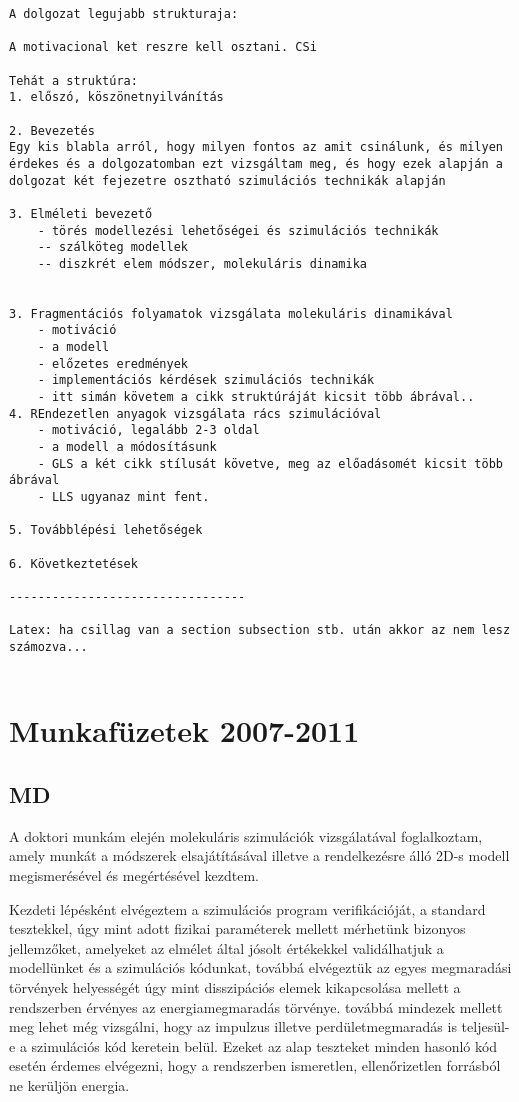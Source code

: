 \begin{verbatim}
A dolgozat legujabb strukturaja:

A motivacional ket reszre kell osztani. CSi

Tehát a struktúra: 
1. előszó, köszönetnyilvánítás

2. Bevezetés
Egy kis blabla arról, hogy milyen fontos az amit csinálunk, és milyen érdekes és a dolgozatomban ezt vizsgáltam meg, és hogy ezek alapján a dolgozat két fejezetre osztható szimulációs technikák alapján

3. Elméleti bevezető
	- törés modellezési lehetőségei és szimulációs technikák
	-- szálköteg modellek
	-- diszkrét elem módszer, molekuláris dinamika
	

3. Fragmentációs folyamatok vizsgálata molekuláris dinamikával
	- motiváció
	- a modell
	- előzetes eredmények
	- implementációs kérdések szimulációs technikák
	- itt simán követem a cikk struktúráját kicsit több ábrával..
4. REndezetlen anyagok vizsgálata rács szimulációval
	- motiváció, legalább 2-3 oldal
	- a modell a módosításunk
	- GLS a két cikk stílusát követve, meg az előadásomét kicsit több ábrával
	- LLS ugyanaz mint fent.

5. Továbblépési lehetőségek

6. Következtetések

---------------------------------

Latex: ha csillag van a section subsection stb. után akkor az nem lesz számozva...


\end{verbatim}

\chapter{Munkafüzetek 2007-2011}

\section{MD}

A doktori munkám elején molekuláris szimulációk vizsgálatával foglalkoztam, amely munkát a módszerek elsajátításával illetve a rendelkezésre álló 2D-s modell megismerésével és megértésével kezdtem.

Kezdeti lépésként elvégeztem a szimulációs program verifikációját, a standard tesztekkel, úgy mint adott  fizikai paraméterek mellett mérhetünk bizonyos jellemzőket, amelyeket az elmélet által jósolt értékekkel validálhatjuk a modellünket és a szimulációs kódunkat, továbbá elvégeztük az egyes megmaradási törvények helyességét úgy mint disszipációs elemek kikapcsolása mellett a rendszerben érvényes az energiamegmaradás törvénye. továbbá mindezek mellett meg lehet még vizsgálni, hogy az impulzus illetve perdületmegmaradás is teljesül-e a szimulációs kód keretein belül. Ezeket az alap teszteket minden hasonló kód esetén érdemes elvégezni, hogy a rendszerben ismeretlen, ellenőrizetlen forrásból ne kerüljön energia.

